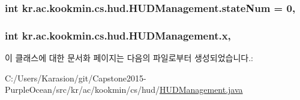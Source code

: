 \subsubsection[{state\+Num}]{\setlength{\rightskip}{0pt plus 5cm}int kr.\+ac.\+kookmin.\+cs.\+hud.\+H\+U\+D\+Management.\+state\+Num = 0\hspace{0.3cm}{\ttfamily [static]}, {\ttfamily [private]}}\label{classkr_1_1ac_1_1kookmin_1_1cs_1_1hud_1_1_h_u_d_management_ac951218e3771940c9b4555f3ac830d7f}
\hypertarget{classkr_1_1ac_1_1kookmin_1_1cs_1_1hud_1_1_h_u_d_management_a3a60a8d9a72d5d242796fdaa9c76905d}{}
\subsubsection[{x}]{\setlength{\rightskip}{0pt plus 5cm}int kr.\+ac.\+kookmin.\+cs.\+hud.\+H\+U\+D\+Management.\+x\hspace{0.3cm}{\ttfamily [static]}, {\ttfamily [private]}}\label{classkr_1_1ac_1_1kookmin_1_1cs_1_1hud_1_1_h_u_d_management_a3a60a8d9a72d5d242796fdaa9c76905d}


이 클래스에 대한 문서화 페이지는 다음의 파일로부터 생성되었습니다.\+:\begin{DoxyCompactItemize}
\item 
C\+:/\+Users/\+Karasion/git/\+Capstone2015-\/\+Purple\+Ocean/src/kr/ac/kookmin/cs/hud/\hyperlink{_h_u_d_management_8java}{H\+U\+D\+Management.\+java}\end{DoxyCompactItemize}

